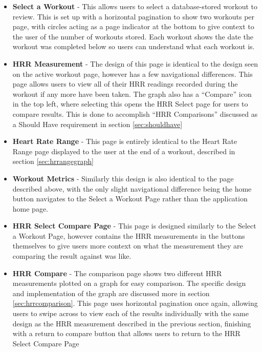 \documentclass{l4proj}
\begin{document}
\begin{itemize}
    \item \textbf{Select a Workout} - This allows users to select a database-stored workout to review. This is set up with a horizontal pagination to show two workouts per page, with circles acting as a page indicator at the bottom to give context to the user of the number of workouts stored. Each workout shows the date the workout was completed below so users can understand what each workout is.
    \item \textbf{HRR Measurement} - The design of this page is identical to the design seen on the active workout page, however has a few navigational differences. This page allows users to view all of their HRR readings recorded during the workout if any more have been taken. The graph also has a “Compare” icon in the top left, where selecting this opens the HRR Select page for users to compare results. This is done to accomplish “HRR Comparisons” discussed as a Should Have requirement in section \ref{sec:shouldhave}
    \item \textbf{Heart Rate Range} - This page is entirely identical to the Heart Rate Range page displayed to the user at the end of a workout, described in section \ref{sec:hrrangegraph}
    \item \textbf{Workout Metrics} - Similarly this design is also identical to the page described above, with the only slight navigational difference being the home button navigates to the Select a Workout Page rather than the application home page.
    \item \textbf{HRR Select Compare Page} - This page is designed similarly to the Select a Workout Page, however contains the HRR measurements in the buttons themselves to give users more context on what the measurement they are comparing the result against was like.
    \item \textbf{HRR Compare} - The comparison page shows two different HRR measurements plotted on a graph for easy comparison. The specific design and implementation of the graph are discussed more in section \ref{sec:hrrcomparison}. This page uses horizontal pagination once again, allowing users to swipe across to view each of the results individually with the same design as the HRR measurement described in the previous section, finishing with a return to compare button that allows users to return to the  HRR Select Compare Page
\end{itemize}
\end{document}
